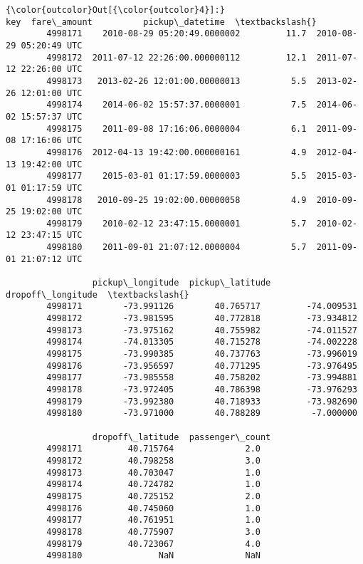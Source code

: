 \documentclass[11pt]{article}
\begin{document}
\begin{Verbatim}[commandchars=\\\{\}]
{\color{outcolor}Out[{\color{outcolor}4}]:}                                    key  fare\_amount          pickup\_datetime  \textbackslash{}
        4998171    2010-08-29 05:20:49.0000002         11.7  2010-08-29 05:20:49 UTC   
        4998172  2011-07-12 22:26:00.000000112         12.1  2011-07-12 22:26:00 UTC   
        4998173   2013-02-26 12:01:00.00000013          5.5  2013-02-26 12:01:00 UTC   
        4998174    2014-06-02 15:57:37.0000001          7.5  2014-06-02 15:57:37 UTC   
        4998175    2011-09-08 17:16:06.0000004          6.1  2011-09-08 17:16:06 UTC   
        4998176  2012-04-13 19:42:00.000000161          4.9  2012-04-13 19:42:00 UTC   
        4998177    2015-03-01 01:17:59.0000003          5.5  2015-03-01 01:17:59 UTC   
        4998178   2010-09-25 19:02:00.00000058          4.9  2010-09-25 19:02:00 UTC   
        4998179    2010-02-12 23:47:15.0000001          5.7  2010-02-12 23:47:15 UTC   
        4998180    2011-09-01 21:07:12.0000004          5.7  2011-09-01 21:07:12 UTC   
        
                 pickup\_longitude  pickup\_latitude  dropoff\_longitude  \textbackslash{}
        4998171        -73.991126        40.765717         -74.009531   
        4998172        -73.981595        40.772818         -73.934812   
        4998173        -73.975162        40.755982         -74.011527   
        4998174        -74.013305        40.715278         -74.002228   
        4998175        -73.990385        40.737763         -73.996019   
        4998176        -73.956597        40.771295         -73.976495   
        4998177        -73.985558        40.758202         -73.994881   
        4998178        -73.972405        40.786398         -73.976293   
        4998179        -73.992380        40.718933         -73.982690   
        4998180        -73.971000        40.788289          -7.000000   
        
                 dropoff\_latitude  passenger\_count  
        4998171         40.715764              2.0  
        4998172         40.798258              3.0  
        4998173         40.703047              1.0  
        4998174         40.724782              1.0  
        4998175         40.725152              2.0  
        4998176         40.745060              1.0  
        4998177         40.761951              1.0  
        4998178         40.775907              3.0  
        4998179         40.723067              4.0  
        4998180               NaN              NaN  
\end{Verbatim}
            
\end{document}

